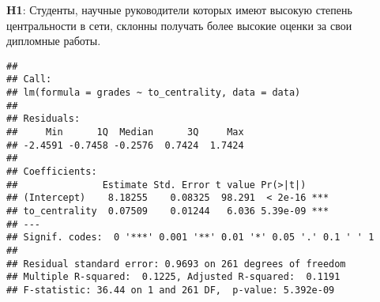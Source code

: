 \documentclass[
]{article}
\newenvironment{Shaded}{\begin{snugshade}}{\end{snugshade}}
\newcommand{\AttributeTok}[1]{\textcolor[rgb]{0.13,0.29,0.53}{#1}}
\newcommand{\FunctionTok}[1]{\textcolor[rgb]{0.13,0.29,0.53}{\textbf{#1}}}
\newcommand{\NormalTok}[1]{#1}
\newcommand{\OtherTok}[1]{\textcolor[rgb]{0.56,0.35,0.01}{#1}}
\newcommand{\SpecialCharTok}[1]{\textcolor[rgb]{0.81,0.36,0.00}{\textbf{#1}}}
\begin{document}
\textbf{H1}: Студенты, научные руководители которых имеют высокую
степень центральности в сети, склонны получать более высокие оценки за
свои дипломные работы.

\begin{Shaded}
\end{Shaded}

\begin{verbatim}
## 
## Call:
## lm(formula = grades ~ to_centrality, data = data)
## 
## Residuals:
##     Min      1Q  Median      3Q     Max 
## -2.4591 -0.7458 -0.2576  0.7424  1.7424 
## 
## Coefficients:
##               Estimate Std. Error t value Pr(>|t|)    
## (Intercept)    8.18255    0.08325  98.291  < 2e-16 ***
## to_centrality  0.07509    0.01244   6.036 5.39e-09 ***
## ---
## Signif. codes:  0 '***' 0.001 '**' 0.01 '*' 0.05 '.' 0.1 ' ' 1
## 
## Residual standard error: 0.9693 on 261 degrees of freedom
## Multiple R-squared:  0.1225, Adjusted R-squared:  0.1191 
## F-statistic: 36.44 on 1 and 261 DF,  p-value: 5.392e-09
\end{verbatim}

\begin{Shaded}
\end{Shaded}
\end{document}
